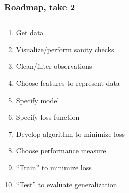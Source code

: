 \documentclass[xcolor=dvipsnames, 9pt]{beamer}
\begin{document}
\begin{frame}
  \frametitle{Roadmap, take 2}

  \begin{columns}
    \begin{column}{0.6\textwidth}
      
  \begin{enumerate}
    \item Get data
    \item Visualize/perform sanity checks
    \item Clean/filter observations
    \item Choose features to represent data
    \item Specify model
    \item Specify loss function 
    \item Develop algorithm to minimize loss 
    \item Choose performance measure
    \item ``Train'' to minimize loss
    \item ``Test'' to evaluate generalization
  \end{enumerate}

    \end{column}
    \begin{column}{0.3\textwidth}


\end{column}
\end{columns}
\end{frame}
\end{document}
